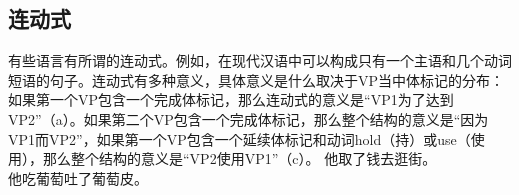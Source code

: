 \begin{exe}
\begin{xlist}[iv.]
\begin{exe}
\begin{xlist}[iv.]
\subsection{连动式}
有些语言有所谓的连动式。例如，在现代汉语中可以构成只有一个主语和几个动词短语的句子\citep[\S~21]{LT81a}。连动式有多种意义，具体意义是什么取决于VP当中体标记的分布： 
如果第一个VP包含一个完成体标记，那么连动式的意义是“VP1为了达到VP2”（a）。如果第二个VP包含一个完成体标记，那么整个结构的意义是“因为VP1而VP2”，如果第一个VP包含一个延续体标记和动词hold（持）或use（使用），那么整个结构的意义是“VP2使用VP1”（c）。
\eal
\ex
     他取了钱去逛街。 \\

\ex
     他吃葡萄吐了葡萄皮。 \\


\end{xlist}
\end{exe}
\end{xlist}
\end{exe}
